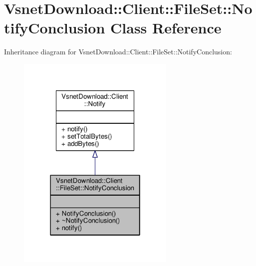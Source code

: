 \hypertarget{classVsnetDownload_1_1Client_1_1FileSet_1_1NotifyConclusion}{}\section{Vsnet\+Download\+:\+:Client\+:\+:File\+Set\+:\+:Notify\+Conclusion Class Reference}
\label{classVsnetDownload_1_1Client_1_1FileSet_1_1NotifyConclusion}


Inheritance diagram for Vsnet\+Download\+:\+:Client\+:\+:File\+Set\+:\+:Notify\+Conclusion\+:
\nopagebreak
\begin{figure}[H]
\begin{center}
\leavevmode
\includegraphics[width=214pt]{d4/d10/classVsnetDownload_1_1Client_1_1FileSet_1_1NotifyConclusion__inherit__graph}
\end{center}
\end{figure}


